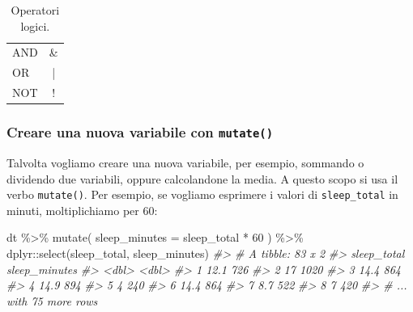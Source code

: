 \documentclass[
  11pt,
]{krantz}
\makeatletter
\newenvironment{Shaded}{\begin{snugshade}}{\end{snugshade}}
\newcommand{\AttributeTok}[1]{\textcolor[rgb]{0.61,0.61,0.61}{#1}}
\newcommand{\CommentTok}[1]{\textcolor[rgb]{0.37,0.37,0.37}{\textit{#1}}}
\newcommand{\DecValTok}[1]{\textcolor[rgb]{0.06,0.06,0.06}{#1}}
\newcommand{\FunctionTok}[1]{\textcolor[rgb]{0,0,0}{#1}}
\newcommand{\NormalTok}[1]{#1}
\newcommand{\SpecialCharTok}[1]{\textcolor[rgb]{0,0,0}{#1}}
\newenvironment{kframe}{%
\medskip{}
\setlength{\fboxsep}{.8em}
 \def\at@end@of@kframe{}%
 \ifinner\ifhmode%
  \def\at@end@of@kframe{\end{minipage}}%
  \begin{minipage}{\columnwidth}%
 \fi\fi%
 \def\FrameCommand##1{\hskip\@totalleftmargin \hskip-\fboxsep
 \colorbox{shadecolor}{##1}\hskip-\fboxsep
     \hskip-\linewidth \hskip-\@totalleftmargin \hskip\columnwidth}%
 \MakeFramed {\advance\hsize-\width
   \@totalleftmargin\z@ \linewidth\hsize
   \@setminipage}}%
 {\par\unskip\endMakeFramed%
 \at@end@of@kframe}
\renewenvironment{Shaded}{\begin{kframe}}{\end{kframe}}
\theoremstyle{definition}
\theoremstyle{definition}
\theoremstyle{definition}
\theoremstyle{definition}
\theoremstyle{remark}
\makeatother
\begin{document}
\begin{table}[h!]
  \begin{center}
    \caption{Operatori logici.}
    \label{tab:oplogici}
    \begin{tabular}{l c} 
      \toprule
      AND      &  \&    \\
      OR       &  | \\
      NOT      &  !   \\
      \bottomrule
    \end{tabular}
  \end{center}
\end{table}

\hypertarget{creare-una-nuova-variabile-con-mutate}{%
\subsubsection{\texorpdfstring{Creare una nuova variabile con \texttt{mutate()}}{Creare una nuova variabile con mutate()}}\label{creare-una-nuova-variabile-con-mutate}}

Talvolta vogliamo creare una nuova variabile, per esempio, sommando o dividendo due variabili, oppure calcolandone la media. A questo scopo si usa il verbo \texttt{mutate()}. Per esempio, se vogliamo esprimere i valori di \texttt{sleep\_total} in minuti, moltiplichiamo per 60:

\begin{Shaded}
\begin{Highlighting}[]
\NormalTok{dt }\SpecialCharTok{\%\textgreater{}\%} 
  \FunctionTok{mutate}\NormalTok{(}
    \AttributeTok{sleep\_minutes =}\NormalTok{ sleep\_total }\SpecialCharTok{*} \DecValTok{60}
\NormalTok{  ) }\SpecialCharTok{\%\textgreater{}\%}
\NormalTok{  dplyr}\SpecialCharTok{::}\FunctionTok{select}\NormalTok{(sleep\_total, sleep\_minutes)}
\CommentTok{\#\textgreater{} \# A tibble: 83 x 2}
\CommentTok{\#\textgreater{}   sleep\_total sleep\_minutes}
\CommentTok{\#\textgreater{}         \textless{}dbl\textgreater{}         \textless{}dbl\textgreater{}}
\CommentTok{\#\textgreater{} 1        12.1           726}
\CommentTok{\#\textgreater{} 2        17            1020}
\CommentTok{\#\textgreater{} 3        14.4           864}
\CommentTok{\#\textgreater{} 4        14.9           894}
\CommentTok{\#\textgreater{} 5         4             240}
\CommentTok{\#\textgreater{} 6        14.4           864}
\CommentTok{\#\textgreater{} 7         8.7           522}
\CommentTok{\#\textgreater{} 8         7             420}
\CommentTok{\#\textgreater{} \# ... with 75 more rows}
\end{Highlighting}
\end{Shaded}
\end{document}
